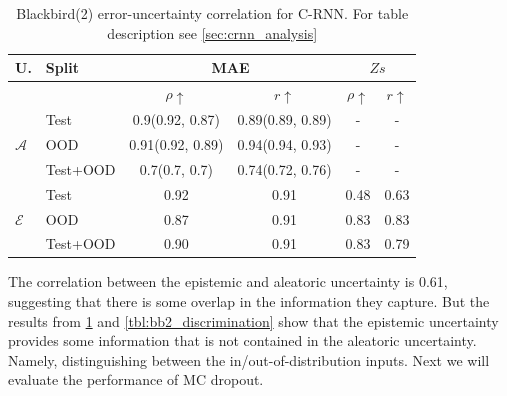 \begin{table}[h]
\centering
    \begin{tabular}{l l c c c c}  
        \toprule
        U. & Split & \multicolumn{2}{c}{MAE} & \multicolumn{2}{c}{$Zs$}\\
        \midrule
        & & $\rho \uparrow$ & $r \uparrow$ & $\rho \uparrow$ & $r \uparrow$ \\
        \multirow{3}{*}{$\mathcal{A}$} 
            & Test     & 0.9(0.92, 0.87) & 0.89(0.89, 0.89) & - & - \\  
            & OOD      & 0.91(0.92, 0.89) & 0.94(0.94, 0.93) & - & - \\  
            & Test+OOD & 0.7(0.7, 0.7) & 0.74(0.72, 0.76) & - & - \\ 

        \midrule
        \multirow{3}{*}{$\mathcal{E}$} 
            & Test     & 0.92  & 0.91 &  0.48  & 0.63 \\  
            & OOD      & 0.87 & 0.91 &  0.83 & 0.83 \\
            & Test+OOD & 0.90 & 0.91 &  0.83 & 0.79 \\ 

        \toprule
    \end{tabular}
    \caption[Blackbird(2) error-uncertainty correlation for C-RNN]{Blackbird(2) error-uncertainty correlation for C-RNN. For table description see \cref{sec:crnn_analysis}}
    \label{tbl:bb2_corr}
\end{table}


The correlation between the epistemic and aleatoric uncertainty is 0.61, suggesting that there is some overlap in the information they capture. But the results from \cref{tbl:bb2_corr} and \cref{tbl:bb2_discrimination} show that the epistemic uncertainty provides some information that is not contained in the aleatoric uncertainty. Namely, distinguishing between the in/out-of-distribution inputs. Next we will evaluate the performance of MC dropout. 

